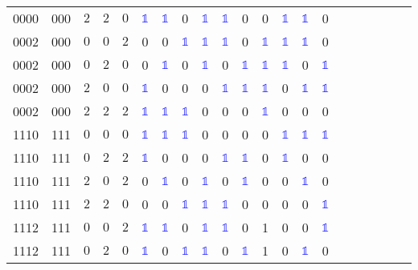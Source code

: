 \begin{longtable*}{c| cccccccccccccccccccc }
0000& 000& $2$& $2$& $0$& \textcolor{blue}{$\mathds{1}$}& \textcolor{blue}{$\mathds{1}$}& 0& \textcolor{blue}{$\mathds{1}$}& \textcolor{blue}{$\mathds{1}$}& 0& 0& \textcolor{blue}{$\mathds{1}$}& \textcolor{blue}{$\mathds{1}$}& 0\\
0002& 000& $0$& $0$& $2$& 0& 0& \textcolor{blue}{$\mathds{1}$}& \textcolor{blue}{$\mathds{1}$}& \textcolor{blue}{$\mathds{1}$}& 0& \textcolor{blue}{$\mathds{1}$}& \textcolor{blue}{$\mathds{1}$}& \textcolor{blue}{$\mathds{1}$}& 0\\
0002& 000& $0$& $2$& $0$& 0& \textcolor{blue}{$\mathds{1}$}& 0& \textcolor{blue}{$\mathds{1}$}& 0& \textcolor{blue}{$\mathds{1}$}& \textcolor{blue}{$\mathds{1}$}& \textcolor{blue}{$\mathds{1}$}& 0& \textcolor{blue}{$\mathds{1}$}\\
0002& 000& $2$& $0$& $0$& \textcolor{blue}{$\mathds{1}$}& 0& 0& 0& \textcolor{blue}{$\mathds{1}$}& \textcolor{blue}{$\mathds{1}$}& \textcolor{blue}{$\mathds{1}$}& 0& \textcolor{blue}{$\mathds{1}$}& \textcolor{blue}{$\mathds{1}$}\\
0002& 000& $2$& $2$& $2$& \textcolor{blue}{$\mathds{1}$}& \textcolor{blue}{$\mathds{1}$}& \textcolor{blue}{$\mathds{1}$}& 0& 0& 0& \textcolor{blue}{$\mathds{1}$}& 0& 0& 0\\
1110& 111& $0$& $0$& $0$& \textcolor{blue}{$\mathds{1}$}& \textcolor{blue}{$\mathds{1}$}& \textcolor{blue}{$\mathds{1}$}& 0& 0& 0& 0& \textcolor{blue}{$\mathds{1}$}& \textcolor{blue}{$\mathds{1}$}& \textcolor{blue}{$\mathds{1}$}\\
1110& 111& $0$& $2$& $2$& \textcolor{blue}{$\mathds{1}$}& 0& 0& 0& \textcolor{blue}{$\mathds{1}$}& \textcolor{blue}{$\mathds{1}$}& 0& \textcolor{blue}{$\mathds{1}$}& 0& 0\\
1110& 111& $2$& $0$& $2$& 0& \textcolor{blue}{$\mathds{1}$}& 0& \textcolor{blue}{$\mathds{1}$}& 0& \textcolor{blue}{$\mathds{1}$}& 0& 0& \textcolor{blue}{$\mathds{1}$}& 0\\
1110& 111& $2$& $2$& $0$& 0& 0& \textcolor{blue}{$\mathds{1}$}& \textcolor{blue}{$\mathds{1}$}& \textcolor{blue}{$\mathds{1}$}& 0& 0& 0& 0& \textcolor{blue}{$\mathds{1}$}\\
1112& 111& $0$& $0$& $2$& \textcolor{blue}{$\mathds{1}$}& \textcolor{blue}{$\mathds{1}$}& 0& \textcolor{blue}{$\mathds{1}$}& \textcolor{blue}{$\mathds{1}$}& 0& 1& 0& 0& \textcolor{blue}{$\mathds{1}$}\\
1112& 111& $0$& $2$& $0$& \textcolor{blue}{$\mathds{1}$}& 0& \textcolor{blue}{$\mathds{1}$}& \textcolor{blue}{$\mathds{1}$}& 0& \textcolor{blue}{$\mathds{1}$}& 1& 0& \textcolor{blue}{$\mathds{1}$}& 0\\

\end{longtable*}

